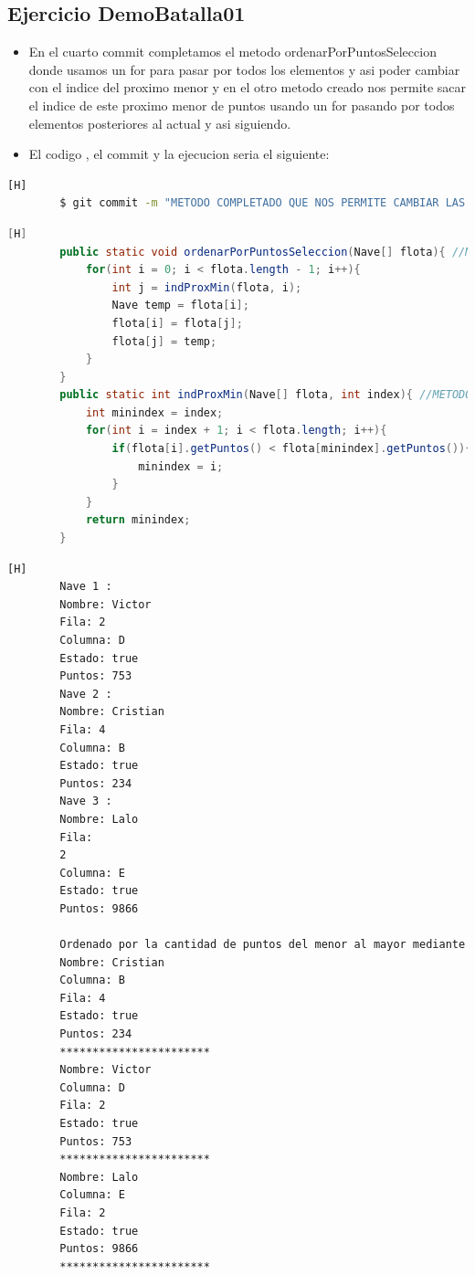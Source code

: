 \documentclass{article}
\begin{document}
	\subsection{Ejercicio DemoBatalla01}
	\begin{itemize}	
		\item En el cuarto commit completamos el metodo ordenarPorPuntosSeleccion donde usamos un for para pasar por todos los elementos y asi poder cambiar con el indice del proximo menor y en el otro metodo creado nos permite sacar el indice de este proximo menor de puntos usando un for pasando por todos elementos posteriores al actual y asi siguiendo. 
		\item El codigo , el commit y la ejecucion seria el siguiente:
	\end{itemize}
	\begin{lstlisting}[language=bash,caption={Commit}][H]
		$ git commit -m "METODO COMPLETADO QUE NOS PERMITE CAMBIAR LAS POSICIONES DE CADA ARREGLO DEPENDIENDO DE LO QUE RETORNE EL METODO indProxMin que sera el indice cual debemos cambiar con el actual y tambien METODO CREADO QUE NOS AYUDA A BUSCAR EL INDICE DEL OBJETO Y NOS DICE CUAL ES EL PROXIMO MENOR APARTIR DEL QUE ESTAMOS Y VA PASANDO POR TODOS LOS ELEMENTOS ASI QUE VA ACTUALIZANDOSE LA VARIABLE MINDEX"
	\end{lstlisting}
	\begin{lstlisting}[language=java,caption={Las lineas de codigo del metodo completado:}][H]
		public static void ordenarPorPuntosSeleccion(Nave[] flota){ //METODO COMPLETADO QUE NOS PERMITE CAMBIAR LAS POSICIONES DE CADA ARREGLO DEPENDIENDO DE LO QUE RETORNE EL METODO indProxMin que sera el indice cual debemos cambiar con el actual
			for(int i = 0; i < flota.length - 1; i++){
				int j = indProxMin(flota, i);
				Nave temp = flota[i];
				flota[i] = flota[j];
				flota[j] = temp;
			}
		}
		public static int indProxMin(Nave[] flota, int index){ //METODO CREADO QUE NOS AYUDA A BUSCAR EL INDICE DEL OBJETO Y NOS DICE CUAL ES EL PROXIMO MENOR  APARTIR DEL QUE ESTAMOS Y VA PASANDO POR TODOS LOS ELEMENTOS ASI QUE VA ACTUALIZANDOSE LA VARIABLE MINDEX
			int minindex = index;
			for(int i = index + 1; i < flota.length; i++){
				if(flota[i].getPuntos() < flota[minindex].getPuntos()){
					minindex = i;
				}
			}
			return minindex;
		}
	\end{lstlisting}
    \begin{lstlisting}[language=bash,caption={La ejecucion dada:}][H]
		Nave 1 : 
		Nombre: Victor
		Fila: 2
		Columna: D
		Estado: true
		Puntos: 753
		Nave 2 : 
		Nombre: Cristian
		Fila: 4
		Columna: B
		Estado: true
		Puntos: 234
		Nave 3 : 
		Nombre: Lalo
		Fila: 
		2
		Columna: E
		Estado: true
		Puntos: 9866
            
		Ordenado por la cantidad de puntos del menor al mayor mediante el metodo seleccion: 
		Nombre: Cristian
		Columna: B
		Fila: 4
		Estado: true
		Puntos: 234
		***********************
		Nombre: Victor
		Columna: D
		Fila: 2
		Estado: true
		Puntos: 753
		***********************
		Nombre: Lalo
		Columna: E
		Fila: 2
		Estado: true
		Puntos: 9866
		***********************

    \end{lstlisting}
\end{document}
